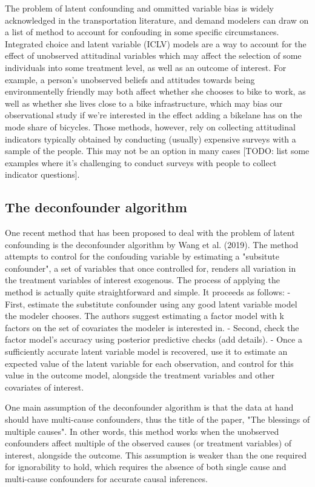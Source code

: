 The problem of latent confounding and ommitted variable bias is widely acknowledged in the transportation literature, and demand modelers can draw on a list of method to account for confouding in some specific circumstances. Integrated choice and latent variable (ICLV) models are a way to account for the effect of unobserved attitudinal variables which may affect the selection of some individuals into some treatment level, as well as an outcome of interest. For example, a person's unobserved beliefs and attitudes towards being environmentelly friendly may both affect whether she chooses to bike to work, as well as whether she lives close to a bike infrastructure, which may bias our observational study if we're interested in the effect adding a bikelane has on the mode share of bicycles. Those methods, however, rely on collecting attitudinal indicators typically obtained by conducting (usually) expensive surveys with a sample of the people. This may not be an option in many cases [TODO: list some examples where it's challenging to conduct surveys with people to collect indicator questions]. 

\subsection{The deconfounder algorithm}

One recent method that has been proposed to deal with the problem of latent confounding is the deconfounder algorithm by Wang et al. (2019). The method attempts to control for the confouding variable by estimating a "subsitute confounder", a set of variables that once controlled for, renders all variation in the treatment variables of interest exogenous. The process of applying the method is actually quite straightforward and simple. It proceeds as follows:
	- First, estimate the substitute confounder using any good latent variable model the modeler chooses. The authors suggest estimating a factor model with k factors on the set of covariates the modeler is interested in. 
	- Second, check the factor model's accuracy using posterior predictive checks (add details). 
	- Once a sufficiently accurate latent variable model is recovered, use it to estimate an expected value of the latent variable for each observation, and control for this value in the outcome model, alongside the treatment variables and other covariates of interest. 

One main assumption of the deconfounder algorithm is that the data at hand should have multi-cause confounders, thus the title of the paper, "The blessings of multiple causes". In other words, this method works when the unobserved confounders affect multiple of the observed causes (or treatment variables) of interest, alongside the outcome. This assumption is weaker than the one required for ignorability to hold, which requires the absence of both single cause and multi-cause confounders for accurate causal inferences. 

